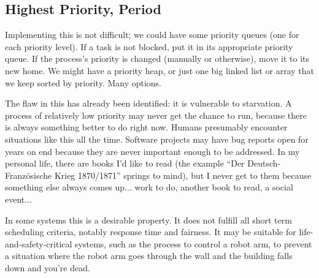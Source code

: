 \subsection*{Highest Priority, Period}

Implementing this is not difficult; we could have some priority queues (one for each priority level). If a task is not blocked, put it in its appropriate priority queue. If the process's priority is changed (manually or otherwise), move it to its new home. We might have a priority heap, or just one big linked list or array that we keep sorted by priority. Many options.

The flaw in this has already been identified: it is vulnerable to starvation. A process of relatively low priority may never get the chance to run, because there is always something better to do right now. Humans presumably encounter situations like this all the time. Software projects may have bug reports open for years on end because they are never important enough to be addressed. In my personal life, there are books I'd like to read (the example ``Der Deutsch-Franz\"osische Krieg 1870/1871'' springs to mind), but I never get to them because something else always comes up... work to do, another book to read, a social event...

In some systems this is a desirable property. It does not fulfill all short term scheduling criteria, notably response time and fairness. It may be suitable for life-and-safety-critical systems, such as the process to control a robot arm, to prevent a situation where the robot arm goes through the wall and the building falls down and you're dead.



